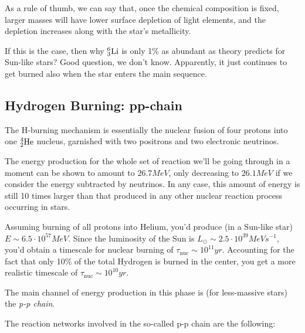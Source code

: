 \par As a rule of thumb, we can say that, once the chemical composition is fixed, larger masses will have lower surface depletion of light elements, and the depletion increases along with the star's metallicity.
\par If this is the case, then why $\element{Li}{6}{3}$ is only 1\% as abundant as theory predicts for Sun-like stars? Good question, we don't know. Apparently, it just continues to get burned also when the star enters the main sequence.

\subsection{Hydrogen Burning: pp-chain}
The H-burning mechanism is essentially the nuclear fusion of four protons into one $\element{He}{4}{2}$ nucleus, garnished with two positrons and two electronic neutrinos.
\par The energy production for the whole set of reaction we'll be going through in a moment can be shown to amount to $26.7\unit{MeV}$, only decreasing to $26.1\unit{MeV}$ if we consider the energy subtracted by neutrinos. In any case, this amount of energy is still 10 times larger than that produced in any other nuclear reaction process occurring in stars.
\par Assuming burning of all protons into Helium, you'd produce (in a Sun-like star) $E\sim 6.5\cdot 10^{57}\unit{MeV}$. Since the luminosity of the Sun is $L_{\odot}\sim 2.5\cdot 10^{39}\unit{MeV}\unit{s}^{-1}$, you'd obtain a timescale for nuclear burning of $\tau_{\text{nuc}} \sim 10^{11}\unit{yr}$. Accounting for the fact that only 10\% of the total Hydrogen is burned in the center, you get a more realistic timescale of $\tau_{\text{nuc}} \sim 10^{10}\unit{yr}$.
\par The main channel of energy production in this phase is (for less-massive stars) the \emph{p-p chain}.
\par The reaction networks involved in the so-called p-p chain are the following:
